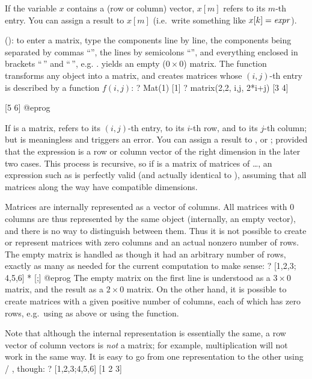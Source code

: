 If the variable $x$ contains a (row or column) vector, $x[m]$ refers to its
$m$-th entry. You can assign a result to $x[m]$ (i.e.~write something like
$x[k]=\hbox{\it expr\/}$).

 (): to enter a matrix, type
the components line by line, the components being separated by commas
``\kbd{,}'', the lines by semicolons ``\kbd{;}'', and everything enclosed in
brackets ``\kbd{[}$\,$'' and ``$\,$\kbd{]}'', e.g. \kbd{[x,y; z,t; u,v]}.
\kbd{[;]} yields an empty ($0 \times 0$) matrix. The function 
transforms any object into a matrix, and  creates matrices
whose $(i,j)$-th entry is described by a function $f(i,j)$:
\bprog
? Mat(1)
[1]
? matrix(2,2, i,j, 2*i+j)
[3 4]

[5 6]
@eprog

If  is a matrix,  refers to its $(i,j)$-th entry,
 to its $i$-th row, and
 to its $j$-th column; but  is meaningless and triggers
an error. You can assign a result to ,  or
; provided that the expression is a row or column vector of the
right dimension in the later two cases. This process is recursive, so if
is a matrix of matrices of \dots, an expression such as  is perfectly valid (and actually identical to ),
assuming that all matrices along the way have compatible dimensions.

 Matrices are internally represented
as a vector of columns. All matrices with $0$ columns are thus represented
by the same object (internally, an empty vector), and there is no way to
distinguish between them. Thus it is not possible to create or represent
matrices with zero columns and an actual nonzero number of rows.
The empty matrix \kbd{[;]} is handled as though it had an arbitrary number of
rows, exactly as many as needed for the current computation to make sense:
\bprog
? [1,2,3; 4,5,6] * [;]
@eprog\noindent
The empty matrix on the first line is understood as a $3\times 0$ matrix, and
the result as a $2\times 0$ matrix. On the other hand, it is possible to
create matrices with a given positive number of columns, each of which has
zero rows, e.g.~using  as above or using the  function.

Note that although the internal representation is essentially the same, a row
vector of column vectors is \emph{not} a matrix; for example, multiplication
will not work in the same way. It is easy to go from one representation to
the other using  / , though:
\bprog
? [1,2,3;4,5,6]
[1 2 3]

